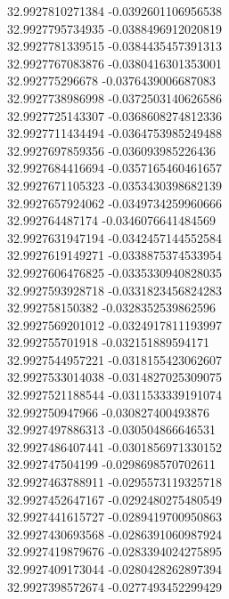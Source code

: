 {32.9927810271384	-0.0392601106956538\\
32.9927795734935	-0.0388496912020819\\
32.9927781339515	-0.0384435457391313\\
32.9927767083876	-0.0380416301353001\\
32.992775296678	-0.0376439006687083\\
32.9927738986998	-0.0372503140626586\\
32.9927725143307	-0.0368608274812336\\
32.9927711434494	-0.0364753985249488\\
32.9927697859356	-0.036093985226436\\
32.9927684416694	-0.0357165460461657\\
32.9927671105323	-0.0353430398682139\\
32.9927657924062	-0.0349734259960666\\
32.992764487174	-0.0346076641484569\\
32.9927631947194	-0.0342457144552584\\
32.9927619149271	-0.0338875374533954\\
32.9927606476825	-0.0335330940828035\\
32.9927593928718	-0.0331823456824283\\
32.992758150382	-0.0328352539862596\\
32.9927569201012	-0.0324917811193997\\
32.992755701918	-0.032151889594171\\
32.9927544957221	-0.0318155423062607\\
32.9927533014038	-0.0314827025309075\\
32.9927521188544	-0.0311533339191074\\
32.992750947966	-0.030827400493876\\
32.9927497886313	-0.030504866646531\\
32.9927486407441	-0.0301856971330152\\
32.992747504199	-0.0298698570702611\\
32.9927463788911	-0.0295573119325718\\
32.9927452647167	-0.0292480275480549\\
32.9927441615727	-0.0289419700950863\\
32.9927430693568	-0.0286391060987924\\
32.9927419879676	-0.0283394024275895\\
32.9927409173044	-0.0280428262897394\\
32.9927398572674	-0.0277493452299429\\
}
